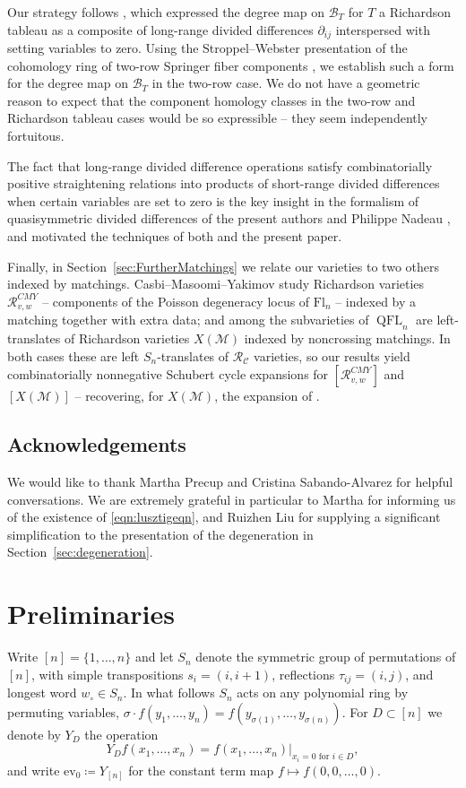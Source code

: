 \documentclass[11pt]{amsart}
\theoremstyle{definition}
\numberwithin{equation}{section}
\newcommand{\ct}{\operatorname{ev_0}} %
\newcommand{\fl}[1]{\mathrm{Fl}_{#1}}
\begin{document}
Our strategy follows \cite{spink2025richardsontableauxschubertpositivity},
which expressed the degree map on $\mathcal{B}_T$ for $T$ a Richardson tableau as a composite of long-range divided differences $\partial_{ij}$ interspersed with setting variables to zero.
Using the Stroppel--Webster presentation of the cohomology ring of two-row Springer fiber components \cite[Theorem 9]{SW12}, we establish such a form for the degree map on $\mathcal{B}_T$ in the two-row case.
We do not have a geometric reason to expect that  the component homology classes in the two-row and Richardson tableau cases would be so expressible -- they seem independently fortuitous.

The fact that long-range divided difference operations satisfy combinatorially positive straightening relations into products of short-range divided differences when certain variables are set to zero is the key insight in the formalism of quasisymmetric divided differences of the present authors and Philippe Nadeau \cite{NST_a}, and motivated the techniques of both \cite{spink2025richardsontableauxschubertpositivity} and the present paper.


Finally, in Section~\ref{sec:FurtherMatchings} we relate our varieties to two others indexed by matchings. Casbi--Masoomi--Yakimov \cite{CMY} study Richardson varieties $\mathcal{R}_{v,w}^{CMY}$ -- components of the Poisson degeneracy locus of $\fl{n}$ -- indexed by a matching together with extra data; and among the subvarieties of $\operatorname{QFL}_n$ are left-translates of Richardson varieties $X(\mathcal{M})$ indexed by noncrossing matchings. In both cases these are left $S_n$-translates of $\mathcal{R}_{\mathcal{C}}$ varieties, so our results yield combinatorially nonnegative Schubert cycle expansions for $[\mathcal{R}_{v,w}^{CMY}]$ and $[X(\mathcal{M})]$ -- recovering, for $X(\mathcal{M})$, the expansion of \cite{NST_c,BGNST2}.

\subsection*{Acknowledgements}
We would like to thank Martha Precup and Cristina Sabando-Alvarez for helpful conversations. We are extremely grateful in particular to Martha for informing us of the existence of \eqref{eqn:lusztigeqn}, and Ruizhen Liu for supplying a significant simplification to the presentation of the degeneration in Section~\ref{sec:degeneration}.


\section{Preliminaries}
Write $[n]=\{1,\ldots,n\}$ and let $S_n$ denote the symmetric group of permutations of $[n]$, with simple transpositions $s_i=(i,i+1)$, reflections $\tau_{ij}=(i,j)$, and longest word $w_\circ\in S_n$. In what follows $S_n$ acts on any polynomial ring by permuting variables, $\sigma\cdot f(y_1,\ldots,y_n)=f(y_{\sigma(1)},\ldots,y_{\sigma(n)})$. For $D\subset[n]$ we denote by $Y_D$ the operation
$$Y_Df(x_1,\ldots,x_n)=f(x_1,\ldots,x_n)|_{x_i=0\text{ for }i\in D},$$
and write $\ct\coloneqq Y_{[n]}$ for the constant term map $f\mapsto f(0,0,\ldots,0)$.
\end{document}
